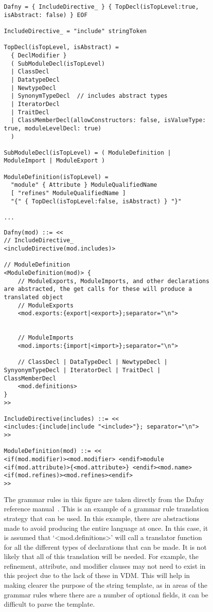 \documentclass{entcs}
\begin{document}
\begin{figure}[h]
	\begin{center}
        \begin{lstlisting}
Dafny = { IncludeDirective_ } { TopDecl(isTopLevel:true, isAbstract: false) } EOF

IncludeDirective_ = "include" stringToken

TopDecl(isTopLevel, isAbstract) =
  { DeclModifier }
  ( SubModuleDecl(isTopLevel)
  | ClassDecl
  | DatatypeDecl
  | NewtypeDecl
  | SynonymTypeDecl  // includes abstract types
  | IteratorDecl
  | TraitDecl
  | ClassMemberDecl(allowConstructors: false, isValueType: true, moduleLevelDecl: true)
  )

SubModuleDecl(isTopLevel) = ( ModuleDefinition | ModuleImport | ModuleExport )

ModuleDefinition(isTopLevel) = 
  "module" { Attribute } ModuleQualifiedName
  [ "refines" ModuleQualifiedName ]
  "{" { TopDecl(isTopLevel:false, isAbstract) } "}"

...
        \end{lstlisting}
        \begin{lstlisting}
Dafny(mod) ::= <<
// IncludeDirective_
<includeDirective(mod.includes)>

// ModuleDefinition
<ModuleDefinition(mod)> {
    // ModuleExports, ModuleImports, and other declarations are abstracted, the get calls for these will produce a translated object
    // ModuleExports 
    <mod.exports:{export|<export>};separator="\n">
    

    // ModuleImports
    <mod.imports:{import|<import>};separator="\n">

    // ClassDecl | DataTypeDecl | NewtypeDecl | SynyonymTypeDecl | IteratorDecl | TraitDecl | ClassMemberDecl
    <mod.definitions>
}
>>

IncludeDirective(includes) ::= <<
<includes:{include|include "<include>"}; separator="\n">
>>

ModuleDefinition(mod) ::= <<
<if(mod.modifier)><mod.modifier> <endif>module <if(mod.attribute)>{<mod.attribute>} <endif><mod.name><if(mod.refines)><mod.refines><endif>
>>
        \end{lstlisting}
		\caption{The grammar rules in this figure are taken directly from the Dafny reference manual~\cite{DfyGrammar}. This is an example of a grammar rule translation strategy that can be used. In this example, there are abstractions made to avoid producing the entire language at once. In this case, it is assumed that `<mod.definitions>' will call a translator function for all the different types of declarations that can be made. It is not likely that all of this translation will be needed. For example, the refinement, attribute, and modifier clauses may not need to exist in this project due to the lack of these in VDM. This will help in making clearer the purpose of the string template, as in areas of the grammar rules where there are a number of optional fields, it can be difficult to parse the template.}\label{fig:string_template_grammar_rule}
	\end{center}
\end{figure}
\end{document}
